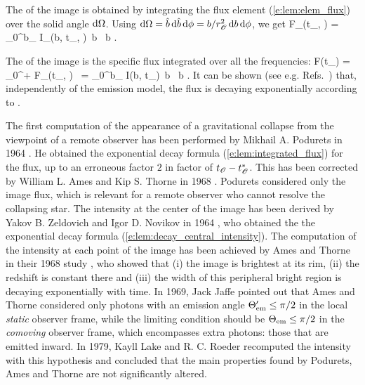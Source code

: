 The  of the image is obtained by integrating
the flux element (\ref{e:lem:elem_flux}) over the solid angle $\mathrm{d}\Omega$. Using
$\mathrm{d}\Omega = \hat{b}\, \mathrm{d}\hat{b}\, \mathrm{d}\phi = b/r_{\mathscr{O}}^2\, \mathrm{d} b\, \mathrm{d}\phi$, we get
\be
    F_\nu(t_\Obs, \nu) =  \int_0^{b_\star} I_\nu(b, t_\Obs, \nu)\, b \, \D b .
\ee

The  of the image is the specific flux integrated over all the frequencies:
\be
    F(t_\Obs) = \int_0^{+\infty} F_\nu(t_\Obs, \nu) \, \D \nu
     =  \int_0^{b_\star} I(b, t_\Obs)\, b \, \D b .
\ee
It can be shown (see e.g. Refs.~\cite{AmesT68,Shapi89}) that, independently of
the emission model, the flux is decaying exponentially according to
\be \label{e:lem:integrated_flux}
     .
\ee

\begin{hist}
The first computation of the appearance of a gravitational collapse from the viewpoint of a remote observer
has been performed by Mikhail A. Podurets in 1964 \cite{Podur64}.
He obtained the exponential decay formula (\ref{e:lem:integrated_flux}) for the flux,
up to an erroneous factor $2$ in factor of $t_{\mathscr{O}} - t_{\mathscr{O}}^*$. This has been
corrected by William L. Ames and Kip S. Thorne in 1968
\cite{AmesT68}. Podurets considered only the image flux, which is relevant for a remote observer who
cannot resolve the collapsing star. The intensity at the center of the image
has been derived by
Yakov B. Zeldovich and Igor D. Novikov
in 1964 \cite{ZeldoN64}, who obtained the the exponential decay formula
(\ref{e:lem:decay_central_intensity}). The computation of the
intensity at each point of the image has been achieved by
Ames and Thorne in their 1968 study \cite{AmesT68}, who showed that (i)
the image is brightest at its rim, (ii) the redshift is constant there and (iii) the width of this
peripheral bright region is decaying exponentially with time. In 1969, Jack Jaffe
\cite{Jaffe69} pointed out that Ames and Thorne considered only photons with
an emission angle $\Theta_{\rm em}' \leq \pi/2$ in the local \emph{static} observer frame,
while the limiting condition should be $\Theta_{\rm em} \leq \pi/2$ in the \emph{comoving} observer frame,
which encompasses extra photons: those that are emitted inward. In 1979, Kayll Lake and
R. C. Roeder \cite{LakeR79}
recomputed the intensity with this hypothesis and concluded
that the main properties found by Podurets, Ames and Thorne are not significantly altered.
\end{hist}

